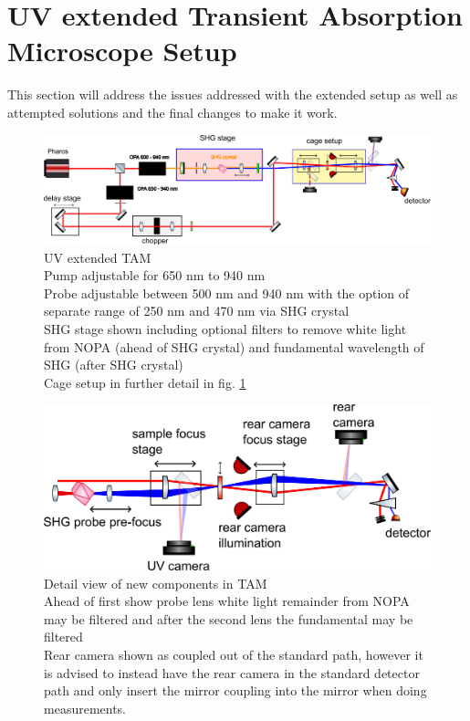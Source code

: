 \documentclass[twoside,openright]{scrreprt}
\begin{document}
\section{UV extended Transient Absorption Microscope Setup}
This section will address the issues addressed with the extended setup as well as attempted solutions and the final changes to make it work.

\begin{figure}[h]
\centering
\includegraphics[width=0.9\linewidth]{images/ComponentLibrary_svg/TAM-SetupUV.png}
\caption{UV extended TAM\\Pump adjustable for 650 nm to 940 nm
\\Probe adjustable between 500 nm and 940 nm with the option of separate range of 250 nm and 470 nm via SHG crystal\\
SHG stage shown including optional filters to remove white light from NOPA (ahead of SHG crystal) and fundamental wavelength of SHG (after SHG crystal)\\ Cage setup in further detail in fig. \ref{Fig:CageSetup}}
\end{figure}

\begin{figure}[h]\label{Fig:CageSetup}
\centering
\includegraphics[width=0.9\linewidth]{images/ComponentLibrary_svg/TAM_Setup-SHGandDetector.png}
\caption{Detail view of new components in TAM\\ Ahead of first show probe lens white light remainder from NOPA may be filtered and after the second lens the fundamental may be filtered\\
Rear camera shown as coupled out of the standard path, however it is advised to instead have the rear camera in the standard detector path and only insert the mirror coupling into the mirror when doing measurements.}
\end{figure}
\end{document}
